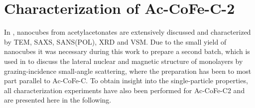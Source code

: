 \documentclass[\main/dresen_thesis.tex]{subfiles}
\begin{document}
\chapter{Characterization of Ac-CoFe-C-2}\label{app:characterizationAcCoFeC2}
  In , nanocubes from acetylacetonates are extensively discussed and characterized by TEM, SAXS, SANS(POL), XRD and VSM.
  Due to the small yield of nanocubes it was necessary during this work to prepare a second batch, which is used in  to discuss the lateral nuclear and magnetic structure of monolayers by grazing-incidence small-angle scattering, where the preparation has been to most part parallel to Ac-CoFe-C.
  To obtain insight into the single-particle properties, all characterization experiments have also been performed for Ac-CoFe-C2 and are presented here in the following.
\end{document}
